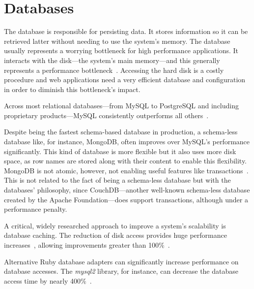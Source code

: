 \section{Databases} %
\label{state:sec:databases}
The database is responsible for persisting data. It stores information so it can be retrieved latter without needing to use the system's memory.
The database usually represents a worrying bottleneck for high performance applications. It interacts with the disk---the system's main memory---and this generally represents a performance bottleneck~\cite{memory_wall}. Accessing the hard disk is a costly procedure and web applications need a very efficient database and configuration in order to diminish this bottleneck's impact.

Across most relational databases---from MySQL to PostgreSQL and including proprietary products---MySQL consistently outperforms all others~\cite{benchmark_relational_databases}.

Despite being the fastest schema-based database in production, a schema-less database like, for instance, MongoDB, often improves over MySQL's performance significantly. This kind of database is more flexible but it also uses more disk space, as row names are stored along with their content to enable this flexibility. MongoDB is not atomic, however, not enabling useful features like transactions~\cite{mysql_to_mongodb}. This is not related to the fact of being a schema-less database but with the databases' philosophy, since CouchDB---another well-known schema-less database created by the Apache Foundation---does support transactions, although under a performance penalty.

A critical, widely researched approach to improve a system's scalability is database caching. The reduction of disk access provides huge performance increases~\cite{scaling_rails_bottomup}, allowing improvements greater than 100\%~\cite{rapid_prototyping_mdd,high_performance_database_caching}.

Alternative Ruby database adapters can significantly increase performance on database accesses. The \textit{mysql2} library, for instance, can decrease the database access time by nearly 400\%~\cite{brianmario_mysql2}.

